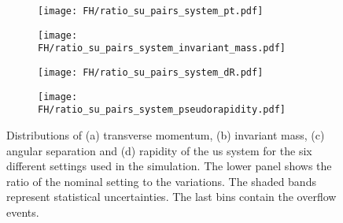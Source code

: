 \begin{figure}[H]
    \centering
    \begin{subfigure}{0.49\textwidth}
        \centering
        \texttt{[image: FH/ratio\_su\_pairs\_system\_pt.pdf]}
        \caption{}
        \label{app:subfig:pt(su)_FH}
    \end{subfigure}
    \begin{subfigure}{0.49\textwidth}
        \centering
        \texttt{[image: FH/ratio\_su\_pairs\_system\_invariant\_mass.pdf]}
        \caption{}
        \label{app:subfig:m(su)_FH}
    \end{subfigure}

    \vspace{0.2cm}
    
    \begin{subfigure}{0.49\textwidth}
        \centering
        \texttt{[image: FH/ratio\_su\_pairs\_system\_dR.pdf]}
        \caption{}
        \label{app:subfig:dR(su)_FH}
    \end{subfigure}
    \begin{subfigure}{0.49\textwidth}
        \centering
        \texttt{[image: FH/ratio\_su\_pairs\_system\_pseudorapidity.pdf]}
        \caption{}
        \label{app:subfig:y(su)_FH}
    \end{subfigure}
    \caption{Distributions of (a) transverse momentum, (b) invariant mass,  (c) angular separation and (d) rapidity of the us system for the six different settings used in the simulation. The lower panel shows the ratio of the nominal setting to the variations. The shaded bands represent statistical uncertainties. The last bins contain the overflow events.}
    \label{app:fig:su_FH}
\end{figure}

